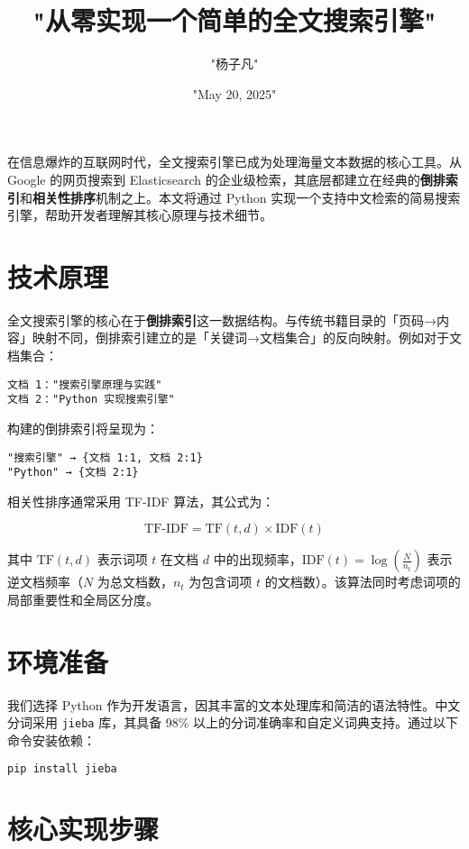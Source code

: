 \title{"从零实现一个简单的全文搜索引擎"}
\author{"杨子凡"}
\date{"May 20, 2025"}
\maketitle
在信息爆炸的互联网时代，全文搜索引擎已成为处理海量文本数据的核心工具。从 Google 的网页搜索到 Elasticsearch 的企业级检索，其底层都建立在经典的\textbf{倒排索引}和\textbf{相关性排序}机制之上。本文将通过 Python 实现一个支持中文检索的简易搜索引擎，帮助开发者理解其核心原理与技术细节。\par
\chapter{技术原理}
全文搜索引擎的核心在于\textbf{倒排索引}这一数据结构。与传统书籍目录的「页码→内容」映射不同，倒排索引建立的是「关键词→文档集合」的反向映射。例如对于文档集合：\par
\begin{lstlisting}
文档 1："搜索引擎原理与实践"
文档 2："Python 实现搜索引擎"
\end{lstlisting}
构建的倒排索引将呈现为：\par
\begin{lstlisting}
"搜索引擎" → {文档 1:1, 文档 2:1}
"Python" → {文档 2:1}
\end{lstlisting}
相关性排序通常采用 TF-IDF 算法，其公式为：\par
$$ \text{TF-IDF} = \text{TF}(t,d) \times \text{IDF}(t) $$\par
其中 $\text{TF}(t,d)$ 表示词项 $t$ 在文档 $d$ 中的出现频率，$\text{IDF}(t) = \log(\frac{N}{n_t})$ 表示逆文档频率（$N$ 为总文档数，$n_t$ 为包含词项 $t$ 的文档数）。该算法同时考虑词项的局部重要性和全局区分度。\par
\chapter{环境准备}
我们选择 Python 作为开发语言，因其丰富的文本处理库和简洁的语法特性。中文分词采用 \verb!jieba! 库，其具备 98\%{} 以上的分词准确率和自定义词典支持。通过以下命令安装依赖：\par
\begin{lstlisting}[language=bash]
pip install jieba
\end{lstlisting}
\chapter{核心实现步骤}
